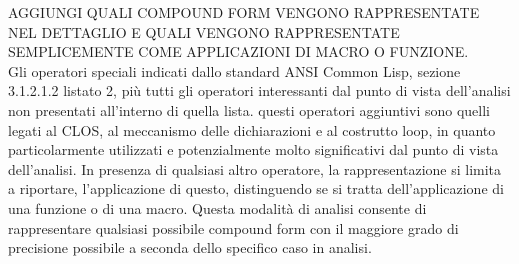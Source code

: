 AGGIUNGI QUALI COMPOUND FORM VENGONO RAPPRESENTATE NEL DETTAGLIO E QUALI
VENGONO RAPPRESENTATE SEMPLICEMENTE COME APPLICAZIONI DI MACRO O FUNZIONE.\\

Gli operatori speciali indicati dallo standard ANSI Common Lisp, sezione
3.1.2.1.2 listato 2, più tutti gli operatori interessanti dal punto di vista
dell’analisi non presentati all’interno di quella lista. questi operatori
aggiuntivi sono quelli legati al CLOS, al meccanismo delle dichiarazioni e al
costrutto loop, in quanto particolarmente utilizzati e potenzialmente molto
significativi dal punto di vista dell’analisi. In presenza di qualsiasi altro
operatore, la rappresentazione si limita a riportare, l’applicazione di
questo, distinguendo se si tratta dell’applicazione di una funzione o di una
macro. Questa modalità di analisi consente di rappresentare qualsiasi
possibile compound form con il maggiore grado di precisione possibile a
seconda dello specifico caso in analisi.
